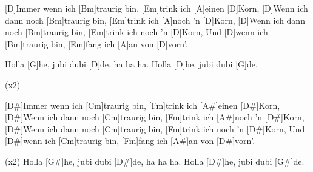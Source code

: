 


\begin{guitar}
	[D]Immer wenn ich [Bm]traurig bin, [Em]trink ich [A]einen [D]Korn,
	[D]Wenn ich dann noch [Bm]traurig bin, [Em]trink ich [A]noch 'n [D]Korn,
	[D]Wenn ich dann noch [Bm]traurig bin, [Em]trink ich noch 'n [D]Korn,
	Und [D]wenn ich [Bm]traurig bin, [Em]fang ich [A]an von [D]vorn'.
	
	Holla [G]he, jubi dubi [D]de, ha ha ha.
	Holla [D]he, jubi dubi [G]de.
	
	 
	
	  (x2)
	
	[D#]Immer wenn ich [Cm]traurig bin, [Fm]trink ich [A#]einen [D#]Korn,
	[D#]Wenn ich dann noch [Cm]traurig bin, [Fm]trink ich [A#]noch 'n [D#]Korn,
	[D#]Wenn ich dann noch [Cm]traurig bin, [Fm]trink ich noch 'n [D#]Korn,
	Und [D#]wenn ich [Cm]traurig bin, [Fm]fang ich [A#]an von [D#]vorn'.
	
	 (x2)
	Holla [G#]he, jubi dubi [D#]de, ha ha ha.
	Holla [D#]he, jubi dubi [G#]de.
\end{guitar}